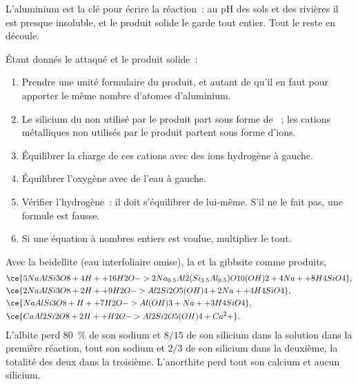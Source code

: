 L'aluminium est la clé pour écrire la réaction~: au pH des sols et des rivières il
est presque insoluble, et le produit solide le garde tout entier. Tout le reste
en découle.

\begin{method}\label{met:b1:weathering-clays:balance}
Étant donnés le  attaqué et le produit solide~:
\begin{enumerate}
  \item Prendre une unité formulaire du produit, et autant de  qu'il en faut pour
        apporter le même nombre d'atomes d'aluminium.
  \item Le silicium du  non utilisé par le produit part sous forme de
        ~; les cations métalliques non utilisés par le produit partent sous forme d'ions.
  \item Équilibrer la charge de ces cations avec des ions hydrogène à gauche.
  \item Équilibrer l'oxygène avec de l'eau à gauche.
  \item Vérifier l'hydrogène~: il doit s'équilibrer de lui-même. S'il ne le fait pas, une
        formule est fausse.
  \item Si une équation à nombres entiers est voulue, multiplier le tout.
\end{enumerate}
\end{method}

\begin{proposition}\label{prop:b1:weathering-clays:feldspars}
Avec la  beidellite 
(eau interfoliaire omise), la   et la gibbsite
 comme produits,
\begin{align*}
&\ce{5 NaAlSi3O8 + 4 H+ + 16 H2O -> 2 Na_{0.5}Al2(Si_{3.5}Al_{0.5})O10(OH)2 + 4 Na+ + 8 H4SiO4},\\ %
&\ce{2 NaAlSi3O8 + 2 H+ + 9 H2O -> Al2Si2O5(OH)4 + 2 Na+ + 4 H4SiO4},\\
&\ce{NaAlSi3O8 + H+ + 7 H2O -> Al(OH)3 + Na+ + 3 H4SiO4},\\
&\ce{CaAl2Si2O8 + 2 H+ + H2O -> Al2Si2O5(OH)4 + Ca^2+}.
\end{align*}
L'albite perd \qty{80}{\percent} de son sodium et $8/15$ de son silicium dans
la solution dans la première réaction, tout son sodium et $2/3$ de son silicium dans
la deuxième, la totalité des deux dans la troisième. L'anorthite perd tout son calcium et
aucun silicium.
\end{proposition}

